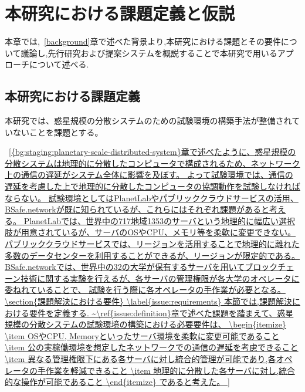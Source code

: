 \chapter{本研究における課題定義と仮説}
\label{issue}

本章では,~\ref{background}章で述べた背景より,本研究における課題とその要件について議論し,先行研究および提案システムを概説することで本研究で用いるアプローチについて述べる.

\section{本研究における課題定義}
\label{issue:definition}

本研究では、惑星規模の分散システムのための試験環境の構築手法が整備されていないことを課題とする。

~\ref{{bg:staging:planetary-scale-distributed-system}章で述べたように、惑星規模の分散システムは地理的に分散したコンピュータで構成されるため、ネットワーク上の通信の遅延がシステム全体に影響を及ぼす。
よって試験環境では、通信の遅延を考慮した上で地理的に分散したコンピュータの協調動作を試験しなければならない。
試験環境としてはPlanetLabやパブリッククラウドサービスの活用、BSafe.networkが既に知られているが、これらにはそれぞれ課題があると考える。
PlanetLabでは、世界中の717地域1353のサーバという地理的に幅広い選択肢が用意されているが、サーバのOSやCPU、メモリ等を柔軟に変更できない。
パブリッククラウドサービスでは、リージョンを活用することで地理的に離れた多数のデータセンターを利用することができるが、リージョンが限定的である。
BSafe.networkでは、世界中の32の大学が保有するサーバを用いてブロックチェーン技術に関する実験を行えるが、各サーバの管理権限が各大学のオペレータに委ねれていることで、
試験を行う際に各オペレータの手作業が必要となる。

\section{課題解決における要件}
\label{issue:requirements}

本節では,課題解決における要件を定義する.

~\ref{issue:definition}章で述べた課題を踏まえて、惑星規模の分散システムの試験環境の構築における必要要件は、
\begin{itemize}
  \item OSやCPU, Memoryといったサーバ環境を柔軟に変更可能であること
  \item 公の実稼働環境を想定したネットワークでの通信の遅延を考慮できること
  \item 異なる管理権限下にある各サーバに対し統合的管理が可能であり,各オペレータの手作業を軽減できること
  \item 地理的に分散した各サーバに対し,統合的な操作が可能であること
\end{itemize}
であると考えた。

}
